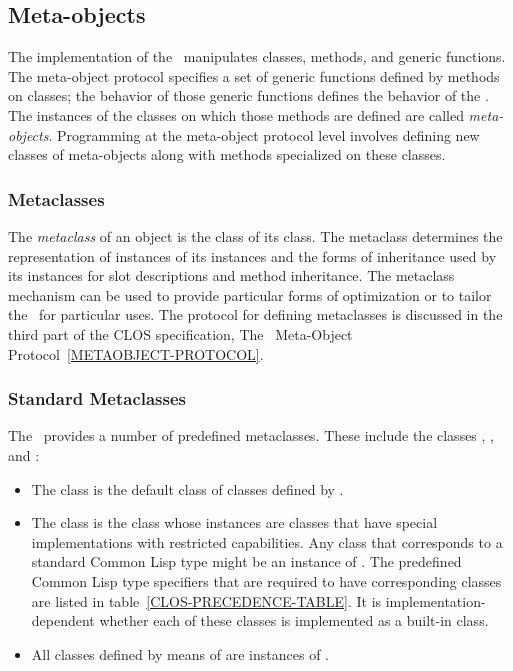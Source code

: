 \subsection{Meta-objects}

The implementation of the \OS\ manipulates classes, methods, and generic
functions.  The meta-object protocol specifies a set of generic
functions defined by methods on classes; the behavior of those generic
functions defines the behavior of the \OS.  The instances of the classes
on which those methods are defined are called \emph{meta-objects}.  Programming
at the meta-object protocol level involves defining new classes of
meta-objects along with methods specialized on these classes.

\subsubsection{Metaclasses}

The \emph{metaclass} of an object is the class of its class.  The
metaclass determines the representation of instances of its instances and
the forms of inheritance used by its instances for slot descriptions and
method inheritance.  The metaclass mechanism can be used to provide
particular forms of optimization or to tailor the \CLOS\ for particular
uses.  The protocol for defining metaclasses is discussed in the third part
of the CLOS specification, The \CLOS\ Meta-Object
Protocol~\ref{METAOBJECT-PROTOCOL}.

\subsubsection{Standard Metaclasses}

The \CLOS\ provides a number of predefined metaclasses.  These include the
classes , , and 
:

\begin{itemize}

\item 
The class  is the default class of classes defined
by .

\item  The class  is the class whose
instances are classes that have special implementations with
restricted capabilities.  Any class that corresponds to a standard
Common Lisp type
might be an instance of .
The predefined Common Lisp type specifiers that are required to have
corresponding classes are listed in table~\ref{CLOS-PRECEDENCE-TABLE}.
It is implementation-dependent whether each of these classes is implemented as a
built-in class.

\item All classes defined by means of  are instances of 
.
\end{itemize}

